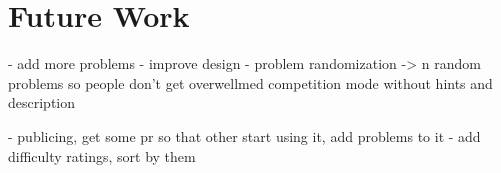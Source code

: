 \section{Future Work}

- add more problems
- improve design
- problem randomization -> n random problems so people don't get overwellmed
    competition mode without hints and description

    - publicing, get some pr so that other start using it, add problems to it 
    - add difficulty ratings, sort by them 
